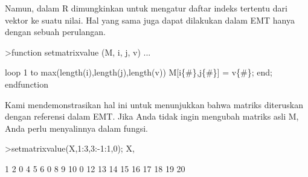 \documentclass[a4paper,10pt]{article}
\begin{document}
\begin{eulernotebook}
\begin{eulercomment}
\begin{eulercomment}
\begin{eulercomment}
\begin{eulercomment}
\begin{eulercomment}
\begin{eulercomment}
\begin{eulercomment}
\begin{eulercomment}
\begin{eulercomment}
\begin{eulercomment}
\begin{eulercomment}
\begin{eulercomment}
\begin{eulercomment}
\begin{eulercomment}
\begin{eulercomment}
\begin{eulercomment}
\begin{eulercomment}
\begin{eulercomment}
\begin{eulercomment}
\begin{eulercomment}
\begin{eulercomment}
\begin{eulercomment}
\begin{eulercomment}
\begin{eulercomment}
\begin{eulercomment}
\begin{eulercomment}
\begin{eulercomment}
\begin{eulercomment}
\begin{eulercomment}
\begin{eulercomment}
\begin{eulercomment}
\begin{eulercomment}
\begin{eulercomment}
\begin{eulercomment}
\begin{eulercomment}
\begin{eulercomment}
\begin{eulercomment}
\begin{eulercomment}
\begin{eulercomment}
\begin{eulercomment}
\begin{eulercomment}
\begin{eulercomment}
\begin{eulercomment}
\begin{eulercomment}
\begin{eulercomment}
\begin{eulercomment}
\begin{eulercomment}
\begin{eulercomment}
\begin{eulercomment}
Namun, dalam R dimungkinkan untuk mengatur daftar indeks tertentu dari
vektor ke suatu nilai. Hal yang sama juga dapat dilakukan dalam EMT
hanya dengan sebuah perulangan.
\end{eulercomment}
\begin{eulerprompt}
>function setmatrixvalue (M, i, j, v) ...
\end{eulerprompt}
\begin{eulerudf}
  loop 1 to max(length(i),length(j),length(v))
     M[i\{#\},j\{#\}] = v\{#\};
  end;
  endfunction
\end{eulerudf}
\begin{eulercomment}
Kami mendemonstrasikan hal ini untuk menunjukkan bahwa matriks
diteruskan dengan referensi dalam EMT. Jika Anda tidak ingin mengubah
matriks asli M, Anda perlu menyalinnya dalam fungsi.
\end{eulercomment}
\begin{eulerprompt}
>setmatrixvalue(X,1:3,3:-1:1,0); X,
\end{eulerprompt}
\begin{euleroutput}
          1         2         0         4         5 
          6         0         8         9        10 
          0        12        13        14        15 
         16        17        18        19        20 
\end{euleroutput}

\end{eulercomment}
\end{eulercomment}
\end{eulercomment}
\end{eulercomment}
\end{eulercomment}
\end{eulercomment}
\end{eulercomment}
\end{eulercomment}
\end{eulercomment}
\end{eulercomment}
\end{eulercomment}
\end{eulercomment}
\end{eulercomment}
\end{eulercomment}
\end{eulercomment}
\end{eulercomment}
\end{eulercomment}
\end{eulercomment}
\end{eulercomment}
\end{eulercomment}
\end{eulercomment}
\end{eulercomment}
\end{eulercomment}
\end{eulercomment}
\end{eulercomment}
\end{eulercomment}
\end{eulercomment}
\end{eulercomment}
\end{eulercomment}
\end{eulercomment}
\end{eulercomment}
\end{eulercomment}
\end{eulercomment}
\end{eulercomment}
\end{eulercomment}
\end{eulercomment}
\end{eulercomment}
\end{eulercomment}
\end{eulercomment}
\end{eulercomment}
\end{eulercomment}
\end{eulercomment}
\end{eulercomment}
\end{eulercomment}
\end{eulercomment}
\end{eulercomment}
\end{eulercomment}
\end{eulercomment}
\end{eulernotebook}
\end{document}
